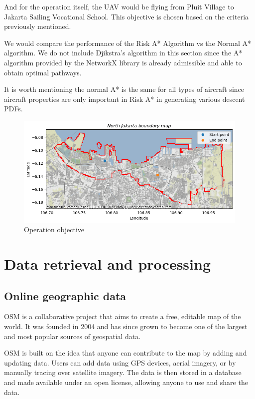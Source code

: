 \documentclass[12pt]{report}
\begin{document}
        And for the operation itself, the UAV would be flying from Pluit Village to Jakarta Sailing Vocational School. This
        objective is chosen based on the criteria previously mentioned.

        We would compare the performance of the Risk A* Algorithm vs the Normal A* algorithm. We do not include Djikstra's
        algorithm in this section since the A* algorithm provided by the NetworkX library is already admissible and able to
        obtain optimal pathways.

        It is worth mentioning the normal A* is the same for all types of aircraft since aircraft properties are only
        important in Risk A* in generating various descent PDFs.

        \begin{figure}[H]
            \centering
            \includegraphics[width=\textwidth]{Plot/route.png}
            \caption{Operation objective}
            \label{fig:map}
        \end{figure}

    \section{Data retrieval and processing}
        \subsection{Online geographic data}
        OSM is a collaborative project that aims to create a free, editable map of the world. It was founded in 2004 and
        has since grown to become one of the largest and most popular sources of geospatial data.
            
        OSM is built on the idea that anyone can contribute to the map by adding and updating data. Users can add data
        using \ac{GPS} devices, aerial imagery, or by manually tracing over satellite imagery. The data is then stored
        in a database and made available under an open license, allowing anyone to use and share the data.
            
\end{document}
